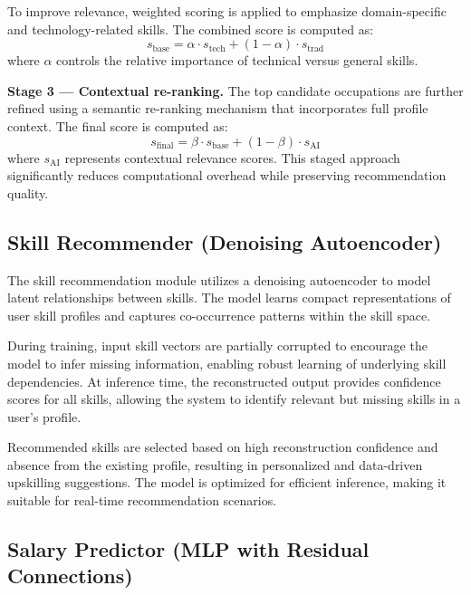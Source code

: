 \documentclass[conference]{IEEEtran}
\begin{document}
To improve relevance, weighted scoring is applied to emphasize domain-specific and technology-related skills. The combined score is computed as:
\begin{equation}
s_{\text{base}} = \alpha \cdot s_{\text{tech}} + (1 - \alpha) \cdot s_{\text{trad}}
\end{equation}
where $\alpha$ controls the relative importance of technical versus general skills.

\textbf{Stage 3 --- Contextual re-ranking.} The top candidate occupations are further refined using a semantic re-ranking mechanism that incorporates full profile context. The final score is computed as:
\begin{equation}
s_{\text{final}} = \beta \cdot s_{\text{base}} + (1 - \beta) \cdot s_{\text{AI}}
\end{equation}
where $s_{\text{AI}}$ represents contextual relevance scores. This staged approach significantly reduces computational overhead while preserving recommendation quality.

\subsection{Skill Recommender (Denoising Autoencoder)}
The skill recommendation module utilizes a denoising autoencoder to model latent relationships between skills. The model learns compact representations of user skill profiles and captures co-occurrence patterns within the skill space.

During training, input skill vectors are partially corrupted to encourage the model to infer missing information, enabling robust learning of underlying skill dependencies. At inference time, the reconstructed output provides confidence scores for all skills, allowing the system to identify relevant but missing skills in a user’s profile.

Recommended skills are selected based on high reconstruction confidence and absence from the existing profile, resulting in personalized and data-driven upskilling suggestions. The model is optimized for efficient inference, making it suitable for real-time recommendation scenarios.

\subsection{Salary Predictor (MLP with Residual Connections)}
\end{document}
